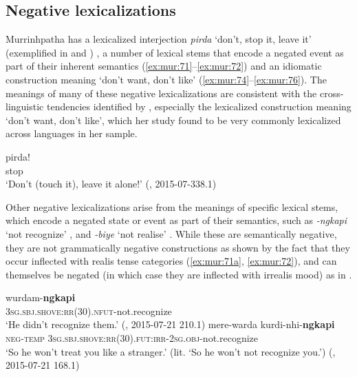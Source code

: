 \documentclass[output=paper,colorlinks,citecolor=brown]{langscibook}
\begin{document}
\subsection{Negative lexicalizations} \label{sec:mur:2.5}

Murrinhpatha has a lexicalized interjection \textit{pirda} ‘don’t, stop it, leave it’ (exemplified in  and )
, a number of lexical stems that encode a negated event as part of their inherent semantics (\ref{ex:mur:71}--\ref{ex:mur:72}) and an idiomatic construction meaning ‘don’t want, don’t like’ (\ref{ex:mur:74}--\ref{ex:mur:76}). The meanings of many of these negative lexicalizations are consistent with the cross-linguistic tendencies identified by \citet{Veselinova2013lexicalization}, especially the lexicalized construction meaning ‘don’t want, don’t like’, which her study found to be very commonly lexicalized across languages in her sample. 

\ea\label{ex:mur:70}
    \gll pirda! \\
         stop\\
    \glt ‘Don’t (touch it), leave it alone!’ (\citealt{MansfieldEtAl2019}, 2015-07-338.1)
\z 

Other negative lexicalizations arise from the meanings of specific lexical stems, which encode a negated state or event as part of their semantics, such as \textit{{}-ngkapi} ‘not recognize’ , and \textit{{}-biye} ‘not realise’ . While these are semantically negative, they are not grammatically negative constructions as shown by the fact that they occur inflected with realis tense categories (\ref{ex:mur:71a}, \ref{ex:mur:72}), and can themselves be negated (in which case they are inflected with irrealis mood) as in .

\ea\label{ex:mur:71}
    \ea\label{ex:mur:71a}
        \gll  wurdam-\textbf{ngkapi}\\ 
              \textsc{3sg.sbj.shove:rr(30).nfut}{}-not.recognize\\
        \glt ‘He didn’t recognize them.’ (\citealt{MansfieldEtAl2019}, 2015-07-21 210.1)
    \ex\label{ex:mur:71b}
        \gll  mere-warda kurdi-nhi-\textbf{ngkapi}\\
              \textsc{neg-temp} \textsc{3sg.sbj.shove:rr(30).fut:irr-2sg.obj}{}-not.recognize\\
        \glt ‘So he won’t treat you like a stranger.’ (lit. ‘So he won’t not recognize you.’) (\citealt{MansfieldEtAl2019}, 2015-07-21 168.1)
    \z
\z 
\end{document}
